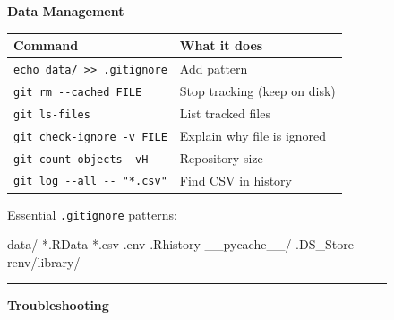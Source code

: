 \documentclass[
  9pt,
  a4paper,
  DIV=11,
  numbers=noendperiod]{scrartcl}
\newenvironment{Shaded}{\begin{snugshade}}{\end{snugshade}}
\newcommand{\NormalTok}[1]{\textcolor[rgb]{0.00,0.23,0.31}{#1}}
\begin{document}
\begin{figure}
\begin{minipage}{0.50\linewidth}
\end{minipage}%
\newline
\begin{minipage}{0.50\linewidth}
\textbf{Data Management}\end{minipage}%
%
\begin{minipage}{0.50\linewidth}

\begin{longtable}[]{@{}ll@{}}
\toprule\noalign{}
Command & What it does \\
\midrule\noalign{}
\endhead
\bottomrule\noalign{}
\endlastfoot
\texttt{echo\ \textquotesingle{}data/\textquotesingle{}\ \textgreater{}\textgreater{}\ .gitignore}
& Add pattern \\
\texttt{git\ rm\ -\/-cached\ FILE} & Stop tracking (keep on disk) \\
\texttt{git\ ls-files} & List tracked files \\
\texttt{git\ check-ignore\ -v\ FILE} & Explain why file is ignored \\
\texttt{git\ count-objects\ -vH} & Repository size \\
\texttt{git\ log\ -\/-all\ -\/-\ "*.csv"} & Find CSV in history \\
\end{longtable}

\end{minipage}%
\newline
\begin{minipage}{0.50\linewidth}
Essential \texttt{.gitignore} patterns:\end{minipage}%
%
\begin{minipage}{0.50\linewidth}

\begin{Shaded}
\begin{Highlighting}[]
\NormalTok{data/}
\NormalTok{*.RData}
\NormalTok{*.csv}
\NormalTok{.env}
\NormalTok{.Rhistory}
\NormalTok{\_\_pycache\_\_/}
\NormalTok{.DS\_Store}
\NormalTok{renv/library/}
\end{Highlighting}
\end{Shaded}

\end{minipage}%
\newline
\begin{minipage}{0.50\linewidth}

\begin{center}\rule{0.5\linewidth}{0.5pt}\end{center}

\end{minipage}%
%
\begin{minipage}{0.50\linewidth}
\textbf{Troubleshooting}\end{minipage}%
\newline
\begin{minipage}{0.50\linewidth}


\end{minipage}
\end{figure}
\end{document}

